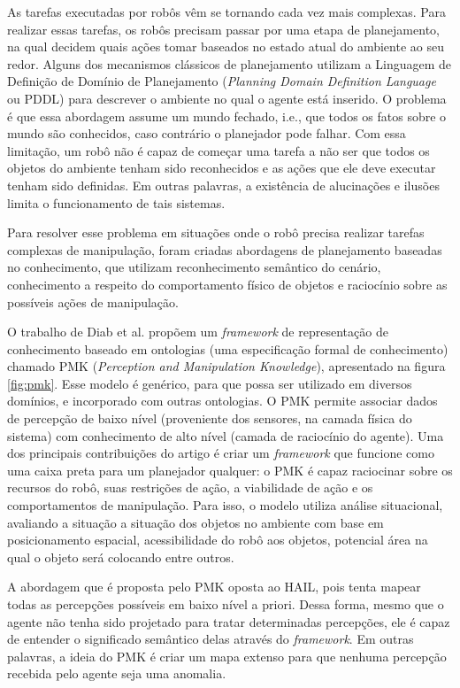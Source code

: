 \label{diab2019}
As tarefas executadas por robôs vêm se tornando cada vez mais complexas. Para realizar essas tarefas, os robôs precisam passar por uma etapa de planejamento, na qual decidem quais ações tomar baseados no estado atual do ambiente ao seu redor. Alguns dos mecanismos clássicos de planejamento utilizam a Linguagem de Definição de Domínio de Planejamento (\textit{Planning Domain Definition Language} ou PDDL) para descrever o ambiente no qual o agente está inserido. O problema é que essa abordagem assume um mundo fechado, i.e., que todos os fatos sobre o mundo são conhecidos, caso contrário o planejador pode falhar. Com essa limitação, um robô não é capaz de começar uma tarefa a não ser que todos os objetos do ambiente tenham sido reconhecidos e as ações que ele deve executar tenham sido definidas. Em outras palavras, a existência de alucinações e ilusões limita o funcionamento de tais sistemas.

Para resolver esse problema em situações onde o robô precisa realizar tarefas complexas de manipulação, foram criadas abordagens de planejamento baseadas no conhecimento, que utilizam reconhecimento semântico do cenário, conhecimento a respeito do comportamento físico de objetos e raciocínio sobre as possíveis ações de manipulação.

O trabalho de Diab et al. propõem um \textit{framework} de representação de conhecimento baseado em ontologias (uma especificação formal de conhecimento) chamado PMK (\textit{Perception and Manipulation Knowledge}), apresentado na figura \ref{fig:pmk}. Esse modelo é genérico, para que possa ser utilizado em diversos domínios, e incorporado com outras ontologias. O PMK permite associar dados de percepção de baixo nível (proveniente dos sensores, na camada física do sistema) com conhecimento de alto nível (camada de raciocínio do agente).
Uma dos principais contribuições do artigo é criar um \textit{framework} que funcione como uma caixa preta para um planejador qualquer: o PMK é capaz raciocinar sobre os recursos do robô, suas restrições de ação, a viabilidade de ação e os comportamentos de manipulação. Para isso, o modelo utiliza análise situacional, avaliando a situação a situação dos objetos no ambiente com base em posicionamento espacial, acessibilidade do robô aos objetos, potencial área na qual o objeto será colocando entre outros. 

A abordagem que é proposta pelo PMK oposta ao HAIL, pois tenta mapear todas as percepções possíveis em baixo nível a priori. Dessa forma, mesmo que o agente não tenha sido projetado para tratar determinadas percepções, ele é capaz de entender o significado semântico delas através do \textit{framework}. Em outras palavras, a ideia do PMK é criar um mapa extenso para que nenhuma percepção recebida pelo agente seja uma anomalia.

